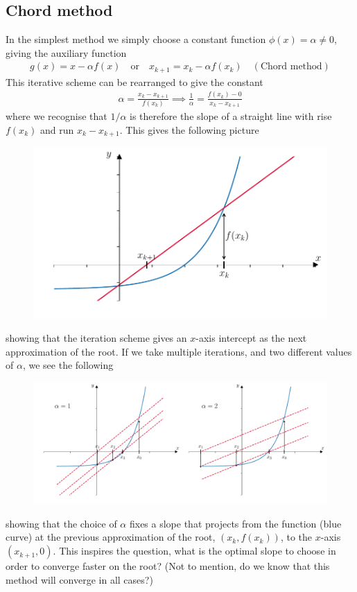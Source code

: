 \subsection{Chord method}
In the simplest method we simply choose a constant function $\phi(x)=\alpha \neq 0$, giving the auxiliary function
\begin{align*}
\boxed{g(x) = x - \alpha f(x) \quad \text{or} \quad x_{k+1} = x_k - \alpha f(x_k) \quad (\text{Chord method})}
\end{align*}
This iterative scheme can be rearranged to give the constant
\begin{align*}
\alpha =  \frac{x_k - x_{k+1}}{f(x_k)} \implies \frac{1}{\alpha} = \frac{f(x_k)-0}{x_k - x_{k+1}}
\end{align*}
where we recognise that $1/\alpha$ is therefore the slope of a straight line with rise $f(x_k)$ and run $x_k - x_{k+1}$. This gives the following picture
\begin{figure}[H]
\begin{center}
\includegraphics[width=0.5\linewidth]{figures/ch2_chord1.pdf}  \label{fig:ch2_chord1}
\end{center}
\end{figure}
\noindent showing that the iteration scheme gives an $x$-axis intercept as the next approximation of the root. If we take multiple iterations, and two different values of $\alpha$, we see the following
\begin{figure}[H]
\begin{center}
\includegraphics[width=0.9\linewidth]{figures/ch2_chord3.pdf}  \label{fig:ch2_chord2}
\end{center}
\end{figure}
\noindent showing that the choice of $\alpha$ fixes a slope that projects from the function (blue curve) at the previous approximation of the root, $(x_k,f(x_k))$, to the $x$-axis $(x_{k+1},0)$. This inspires the question, what is the optimal slope to choose in order to converge faster on the root? (Not to mention, do we know that this method will converge in all cases?)

